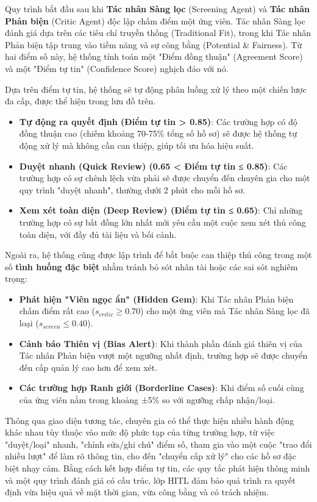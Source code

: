 \documentclass{article}
\begin{document}
\begin{itemize}[topsep=0pt, itemsep=4pt, leftmargin=40pt]
Quy trình bắt đầu sau khi \textbf{Tác nhân Sàng lọc} (Screening Agent) và \textbf{Tác nhân Phản biện} (Critic Agent) độc lập chấm điểm một ứng viên. Tác nhân Sàng lọc đánh giá dựa trên các tiêu chí truyền thống (Traditional Fit), trong khi Tác nhân Phản biện tập trung vào tiềm năng và sự công bằng (Potential & Fairness). Từ hai điểm số này, hệ thống tính toán một "Điểm đồng thuận" (Agreement Score) và một "Điểm tự tin" (Confidence Score) nghịch đảo với nó.

Dựa trên điểm tự tin, hệ thống sẽ tự động phân luồng xử lý theo một chiến lược đa cấp, được thể hiện trong lưu đồ trên.
\begin{itemize}[topsep=0pt, itemsep=4pt, leftmargin=40pt]
    \item \textbf{Tự động ra quyết định (Điểm tự tin > 0.85)}: Các trường hợp có độ đồng thuận cao (chiếm khoảng 70-75\% tổng số hồ sơ) sẽ được hệ thống tự động xử lý mà không cần can thiệp, giúp tối ưu hóa hiệu suất.
    \item \textbf{Duyệt nhanh (Quick Review) (0.65 < Điểm tự tin ≤ 0.85)}: Các trường hợp có sự chênh lệch vừa phải sẽ được chuyển đến chuyên gia cho một quy trình "duyệt nhanh", thường dưới 2 phút cho mỗi hồ sơ.
    \item \textbf{Xem xét toàn diện (Deep Review) (Điểm tự tin ≤ 0.65)}: Chỉ những trường hợp có sự bất đồng lớn nhất mới yêu cầu một cuộc xem xét thủ công toàn diện, với đầy đủ tài liệu và bối cảnh.
\end{itemize}

Ngoài ra, hệ thống cũng được lập trình để bắt buộc can thiệp thủ công trong một số \textbf{tình huống đặc biệt} nhằm tránh bỏ sót nhân tài hoặc các sai sót nghiêm trọng:
\begin{itemize}[topsep=0pt, itemsep=4pt, leftmargin=40pt]
    \item \textbf{Phát hiện "Viên ngọc ẩn" (Hidden Gem)}: Khi Tác nhân Phản biện chấm điểm rất cao ($s_{critic}\ge0.70$) cho một ứng viên mà Tác nhân Sàng lọc đã loại ($s_{screen} \le 0.40$).
    \item \textbf{Cảnh báo Thiên vị (Bias Alert)}: Khi thành phần đánh giá thiên vị của Tác nhân Phản biện vượt một ngưỡng nhất định, trường hợp sẽ được chuyển đến cấp quản lý cao hơn để xem xét.
    \item \textbf{Các trường hợp Ranh giới (Borderline Cases)}: Khi điểm số cuối cùng của ứng viên nằm trong khoảng ±5\% so với ngưỡng chấp nhận/loại.
\end{itemize}

Thông qua giao diện tương tác, chuyên gia có thể thực hiện nhiều hành động khác nhau tùy thuộc vào mức độ phức tạp của từng trường hợp, từ việc "duyệt/loại" nhanh, "chỉnh sửa/ghi chú" điểm số, tham gia vào một cuộc "trao đổi nhiều lượt" để làm rõ thông tin, cho đến "chuyển cấp xử lý" cho các hồ sơ đặc biệt nhạy cảm. Bằng cách kết hợp điểm tự tin, các quy tắc phát hiện thông minh và một quy trình đánh giá có cấu trúc, lớp HITL đảm bảo quá trình ra quyết định vừa hiệu quả về mặt thời gian, vừa công bằng và có trách nhiệm.


\end{itemize}
\end{document}
